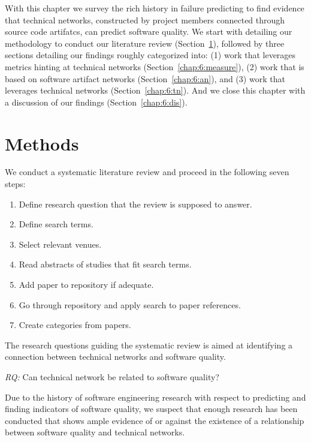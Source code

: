 \label{chap:tech-net}
With this chapter we survey the rich history in failure predicting to find evidence that technical networks, constructed by project members connected through source code artifatcs, can predict software quality.
We start with detailing our methodology to conduct our literature review (Section~\ref{chap:6:methods}), followed by three sections detailing our findings roughly categorized into: 
(1) work that leverages metrics hinting at technical networks (Section~\ref{chap:6:measure}),
(2) work that is based on software artifact networks (Section~\ref{chap:6:an}),
and (3) work that leverages technical networks (Section~\ref{chap:6:tn}).
And we close this chapter with a discussion of our findings (Section~\ref{chap:6:dis}).

\section{Methods}
\label{chap:6:methods}
We conduct a systematic literature review and proceed in the following seven steps:

\begin{enumerate}
\item Define research question that the review is supposed to answer.
\item Define search terms.
\item Select relevant venues.
\item Read abstracts of studies that fit search terms.
\item Add paper to repository if adequate.
\item Go through repository and apply search to paper references.
\item Create categories from papers.
\end{enumerate}

The research questions guiding the systematic review is aimed at identifying a connection between technical networks and software quality.

\begin{note}
\emph{RQ:} Can technical network be related to software quality? 
\end{note}

Due to the history of software engineering research with respect to predicting and finding indicators of software quality, we suspect that enough research has been conducted that shows ample evidence of or against the existence of a relationship between software quality and technical networks.

